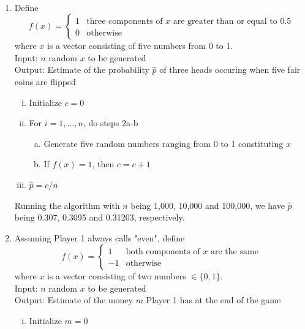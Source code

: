 \documentclass[10pt]{report}
\title{
	\courseTitle\\
	\hwNo\\
	\hwDate
}
\author{\hwAuther}
\date{}
\begin{document}
\maketitle

\begin{enumerate}
	\item 
	Define
	\[
	f(x) = 
	\begin{cases}
		1 & \text{three components of $x$ are greater than or equal to 0.5}\\
		0 & \text{otherwise}
	\end{cases}
	\]
	where $x$ is a vector consisting of five numbers from 0 to 1.\\
	Input: $n$ random $x$ to be generated\\
	Output: 
	Estimate of the probability $\hat{p}$ of three heads occuring when five fair coins are flipped
	\begin{enumerate}[i.]
		\item
		Initialize $c=0$
		
		\item
		For $i=1, \dots, n$, do steps 2a-b
		\begin{enumerate}[a.]
			\item 
			Generate five random numbers ranging from 0 to 1 constituting $x$
			
			\item 
			If $f(x) = 1$, then $c=c+1$
		\end{enumerate}
		
		\item
		$\hat{p} = c/n$
	\end{enumerate}
	Running the algorithm with $n$ being 1,000, 10,000 and 100,000, we have $\hat{p}$ being 0.307, 0.3095 and 0.31203, respectively.
	
	\item 
	Assuming Player 1 always calls "even", define
	\[
	f(x) = 
	\begin{cases}
	1 & \text{both components of $x$ are the same}\\
	-1 & \text{otherwise}
	\end{cases}
	\]
	where $x$ is a vector consisting of two numbers $\in \{0, 1\}$.\\
	Input: $n$ random $x$ to be generated\\
	Output: 
	Estimate of the money $m$ Player 1 has at the end of the game
	\begin{enumerate}[i.]
		\item
		Initialize $m=0$
		

\end{enumerate}
\end{enumerate}
\end{document}
